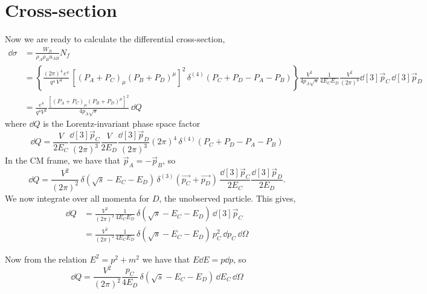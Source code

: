 \section{Cross-section}
Now we are ready to calculate the differential cross-section,
\begin{align}
\dd{\sigma} &= \frac{W_{fi}}{\rho_A\rho_Bu_{AB}} N_f \\
&= \left\{ \frac{(2\pi)^4\,e^4}{q^4 \, V^4} \, \left[ (P_A + P_C)_\mu (P_B + P_D)^\mu \right]^2\, \delta^{(4)}(P_C+P_D-P_A-P_B) \right\} \frac{V^2}{4p_A\sqrt{s}} \frac{1}{4E_CE_D}\frac{V^2}{(2\pi)^6} \dd[3]{\vec{p}_C} \, \dd[3]{\vec{p}_D} \nonumber \\
&= \frac{e^4}{q^4V^2} \frac{\left[ (P_A + P_C)_\mu (P_B + P_D)^\mu \right]^2}{4p_A\sqrt{s}} \, \dd{Q}
\end{align}
where $\dd{Q}$ is the Lorentz-invariant phase space factor
\begin{equation}
\dd{Q} = \frac{V}{2E_C} \frac{\dd[3]{\vec{p}_C}}{(2\pi)^3} \frac{V}{2E_D} \frac{\dd[3]{\vec{p}_D}}{(2\pi)^3} (2\pi)^4 \, \delta^{(4)}(P_C+P_D-P_A-P_B)
\end{equation}
In the CM frame, we have that $\vec{p}_A = -\vec{p}_B$, so
\begin{equation}
\dd{Q} = \frac{V^2}{(2\pi)^2} \, \delta(\sqrt{s} - E_C - E_D) \, \delta^{(3)}(\vec{p_C} + \vec{p_D}) \, \frac{\dd[3]{\vec{p}_C}}{2E_C} \frac{\dd[3]{\vec{p}_D}}{2E_D}.
\end{equation}
We now integrate over all momenta for $D$, the unobserved particle. This gives,
\begin{align}
\dd{Q} &= \frac{V^2}{(2\pi)^2} \frac{1}{4E_C E_D} \, \delta(\sqrt{s} - E_C - E_D) \, \dd[3]{\vec{p}_C} \\
&= \frac{V^2}{(2\pi)^2} \frac{1}{4E_C E_D} \, \delta(\sqrt{s} - E_C - E_D) \, p_C^2 \, \dd{p_C} \, \dd{\Omega}
\end{align}

Now from the relation $E^2 = p^2 + m^2$ we have that $E \dd{E} = p\dd{p}$, so
\begin{equation}
\dd{Q} = \frac{V^2}{(2\pi)^2} \frac{p_C}{4 E_D} \, \delta(\sqrt{s} - E_C - E_D)  \, \dd{E_C} \, \dd{\Omega}
\end{equation}

